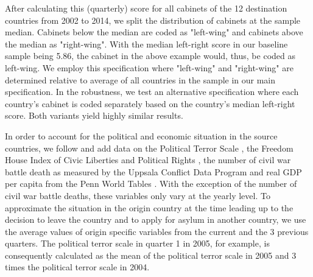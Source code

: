 \documentclass[a4paper,12pt]{article}
\begin{document}
After calculating this (quarterly) score for all cabinets of the 12 destination countries from 2002 to 2014, we split the distribution of cabinets at the sample median. Cabinets below the median are coded as "left-wing" and cabinets above the median as "right-wing". With the median left-right score in our baseline sample being 5.86, the cabinet in the above example would, thus, be coded as left-wing. We employ this specification where "left-wing" and "right-wing" are determined relative to average of all countries in the sample in our main specification. In the robustness, we test an alternative specification where each country's cabinet is coded separately based on the country's median left-right score. Both variants yield highly similar results. 

In order to account for the political and economic situation in the source countries, we follow \cite{hatton2016} and add data on the Political Terror Scale \citep{PTS2016}, the Freedom House Index of Civic Liberties and Political Rights \citep{FHI2017}, the number of civil war battle death as measured by the Uppsala Conflict Data Program \citep{Uppsala2017} and real GDP per capita from the Penn World Tables \citep{PWT2015}.  With the exception of the number of civil war battle deaths, these variables only vary at the yearly level. To approximate the situation in the origin country at the time leading up to the decision to leave the country and to apply for asylum in another country, we use the average values of origin specific variables from the current and the 3 previous quarters. The political terror scale in quarter 1 in 2005, for example, is consequently calculated as the mean of the political terror scale in 2005 and 3 times the political terror scale in 2004. 
\end{document}
